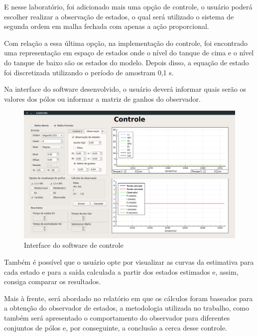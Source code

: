 \documentclass[a4paper,12pt]{article}
\begin{document}
\hspace{4ex}E nesse laboratório, foi adicionado mais uma opção de controle, o usuário poderá escolher realizar a observação de estados, o qual será utilizado o sistema de segunda ordem em malha fechada com apenas a ação proporcional. 

\hspace{4ex}Com relação a essa última opção, na implementação do controle, foi encontrado uma representação em espaço de estados onde o nível do tanque de cima e o nível do tanque de baixo são os estados do modelo. Depois disso, a equação de estado foi discretizada utilizando o período de amostram 0,1 s.

\hspace{4ex}Na interface do software desenvolvido, o usuário deverá informar quais serão os valores dos pólos ou informar a matriz de ganhos do observador.

\begin{figure}[H]
\centering
\includegraphics[width=13cm]{fotosLab5/interfaceObs.png}
\caption{Interface do software de controle}
\label{interface}
\end{figure}

\hspace{4ex}Também é possível que o usuário opte por visualizar as curvas da estimativa para cada estado e para a saída calculada a partir dos estados estimados e, assim, consiga comparar os resultados.

\hspace{4ex}Mais à frente, será abordado no relatório em que os cálculos foram baseados para a obtenção do observador de estados, a metodologia utilizada no trabalho, como também será apresentado o comportamento do observador para diferentes conjuntos de pólos e, por conseguinte, a conclusão a cerca desse controle.
\end{document}
